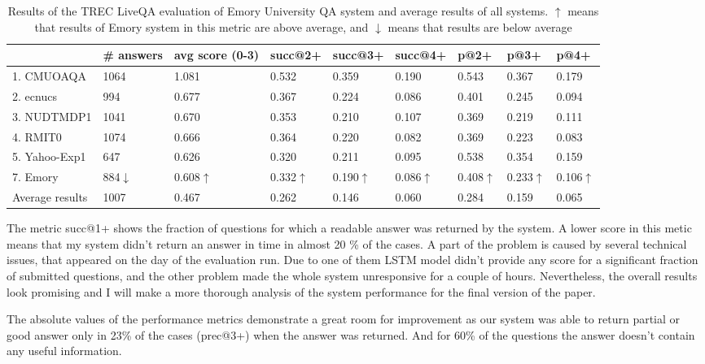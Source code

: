 \begin{table}
	\caption{Results of the TREC LiveQA evaluation of Emory University QA system and average results of all systems. $\uparrow$ means that results of Emory system in this metric are above average, and $\downarrow$ means that results are below average}
	\label{table:liveqa-results}
	\begin{tabular}{|p{2.5cm}|p{1.7cm}|p{1.3cm}|p{1.3cm}|p{1.3cm}|p{1.3cm}|p{1cm}|p{1cm}|p{1cm}|}
		\hline
		& \# answers & avg score (0-3) & succ@2+ & succ@3+ & succ@4+ & p@2+ &  p@3+ & p@4+ \\
		\hline
		1. CMUOAQA & 1064 & 1.081 & 0.532 & 0.359 & 0.190 & 0.543 & 0.367 & 0.179 \\
		2. ecnucs & 994 & 0.677 & 0.367 & 0.224 & 0.086 & 0.401 & 0.245 & 0.094\\
		3. NUDTMDP1 & 1041 & 0.670 & 0.353 & 0.210 & 0.107 & 0.369 & 0.219 & 0.111\\
		4. RMIT0 & 1074 & 0.666 & 0.364 & 0.220 & 0.082 & 0.369 & 0.223 & 0.083\\
		5. Yahoo-Exp1 & 647 & 0.626 & 0.320 & 0.211 & 0.095 & 0.538 & 0.354 & 0.159\\
		\hline
		7. Emory & 884$\downarrow$ & 0.608$\uparrow$ & 0.332$\uparrow$ & 0.190$\uparrow$ & 0.086$\uparrow$ & 0.408$\uparrow$ & 0.233$\uparrow$ & 0.106$\uparrow$\\
		\hline
		Average results & 1007 & 0.467 & 0.262 & 0.146 & 0.060 & 0.284 & 0.159 & 0.065\\
		\hline
	\end{tabular}
\end{table}

The metric succ@1+ shows the fraction of questions for which a readable answer was returned by the system.
A lower score in this metic means that my system didn't return an answer in time in almost 20 \% of the cases.
A part of the problem is caused by several technical issues, that appeared on the day of the evaluation run.
Due to one of them LSTM model didn't provide any score for a significant fraction of submitted questions, and the other problem made the whole system unresponsive for a couple of hours.
Nevertheless, the overall results look promising and I will make a more thorough analysis of the system performance for the final version of the paper.

The absolute values of the performance metrics demonstrate a great room for improvement as our system was able to return partial or good answer only in 23\% of the cases (prec@3+) when the answer was returned.
And for 60\% of the questions the answer doesn't contain any useful information.


